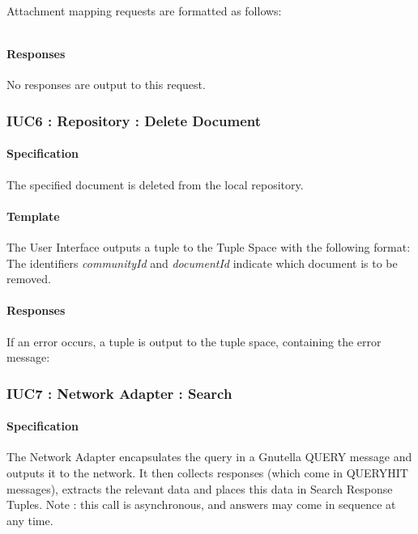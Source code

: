 \documentclass[titlepage]{article}%
\begin{document}
Attachment mapping requests are formatted as follows:

\begin{equation*}
[\text{``MapFile"}; communityId; documentId; filepath; attachname]
\end{equation*}

\paragraph{Responses}
No responses are output to this request.

\subsubsection{IUC6 : Repository : Delete Document}
\label{iuc6}
\paragraph{Specification}
The specified document is deleted from the local repository. 

\paragraph{Template}
The User Interface outputs a tuple to the Tuple Space with the following format:
\begin{equation*}
[\text{``Remove"}; communityId; documentId]
\end{equation*}
The identifiers \emph{communityId} and \emph{documentId} indicate which document is to be removed.

\paragraph{Responses}
If an error occurs, a tuple is output to the tuple space, containing the error message:
\begin{equation*}
[\text{``NotifyError"}; errormsg]
\end{equation*}


\subsubsection{IUC7 : Network Adapter : Search}
\label{iuc7}
\paragraph{Specification} The Network Adapter encapsulates the query in a Gnutella QUERY message and outputs it to the network. It then collects responses (which come in QUERYHIT messages), extracts the relevant data and places this data in Search Response Tuples.
Note : this call is asynchronous, and answers may come in sequence at any time.
\end{document}
